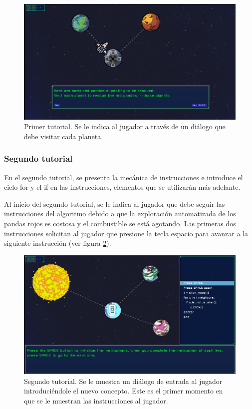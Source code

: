\begin{figure}[h]
	\centering
	\includegraphics[scale=0.3]{imagenes/FirstTutorial.png}
	\caption{Primer tutorial. Se le indica al jugador a través de un diálogo que debe visitar cada planeta.}
	\label{FirstTutorial}
\end{figure}



\subsubsection{Segundo tutorial}

En el segundo tutorial, se presenta la mecánica de instrucciones e introduce el ciclo for y el if en las instrucciones, elementos que se utilizarán más adelante.

Al inicio del segundo tutorial, se le indica al jugador que debe seguir las instrucciones del algoritmo debido a que la exploración automatizada de los pandas rojos es costosa y el combustible se está agotando. Las primeras dos instrucciones solicitan al jugador que presione la tecla espacio para avanzar a la siguiente instrucción (ver figura \ref{SecondTutorial}).


\begin{figure}[h]
	\centering
	\includegraphics[scale=0.2]{imagenes/SecondTutorial.png}
	\caption{Segundo tutorial. Se le muestra un diálogo de entrada al jugador introduciéndole el nuevo concepto. Este es el primer momento en que se le muestran las instrucciones al jugador.}
	\label{SecondTutorial}
\end{figure}

